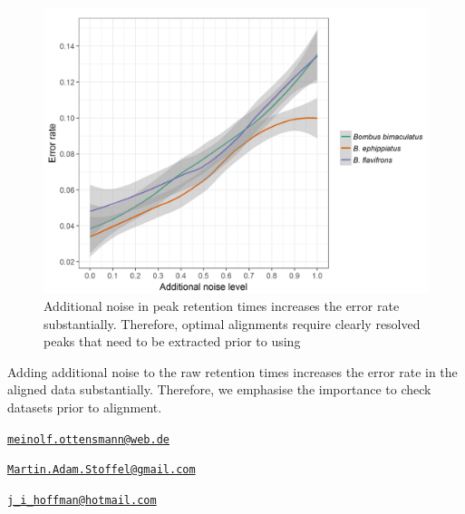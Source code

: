 \begin{figure}[htbp]
\centering
\includegraphics[width=13cm]{figures/noise_simulation}
\caption{Additional noise in peak retention times increases the error rate substantially. Therefore, optimal alignments require clearly resolved peaks that need to be extracted prior to using }
\label{figure:noise}
\end{figure}

Adding additional noise to the raw retention times increases the error
rate in the aligned data substantially. Therefore, we emphasise the
importance to check datasets prior to alignment.



\address{%
Meinolf Ottensmann\\
Department of Animal Behaviour\\
Bielefeld University\\ Morgenbreede 45\\ 33615 Bielefeld\\
}
\href{mailto:meinolf.ottensmann@web.de}{\nolinkurl{meinolf.ottensmann@web.de}}

\address{%
Martin A. Stoffel\\
Department of Animal Behaviour\\
Bielefeld University\\ Morgenbreede 45\\ 33615 Bielefeld\\
}
\href{mailto:Martin.Adam.Stoffel@gmail.com}{\nolinkurl{Martin.Adam.Stoffel@gmail.com}}

\address{%
Joseph I. Hoffman\\
Department of Animal Behaviour\\
Bielefeld University\\ Morgenbreede 45\\ 33615 Bielefeld\\
}
\href{mailto:j_i_hoffman@hotmail.com}{\nolinkurl{j\_i\_hoffman@hotmail.com}}

